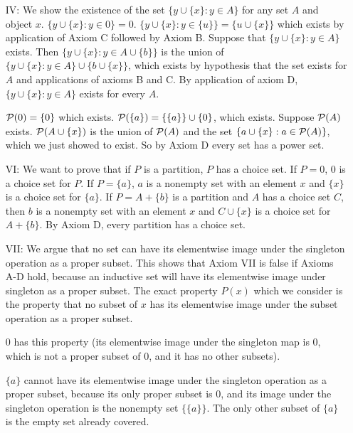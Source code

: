 \documentclass[12pt]{article}
\begin{document}
\begin{enumerate}
\begin{description}
\begin{enumerate}
\item[IV:]  We show the existence of the set $\{y \cup \{x\}:y \in A\}$ for any set $A$ and object $x$.  $\{y \cup \{x\}:y \in 0\} = 0$.
$\{y \cup \{x\}:y \in \{u\}\} = \{u \cup \{x\}\}$ which exists by application of Axiom C followed by Axiom B.  Suppose that $\{y \cup \{x\}:y \in A\}$ exists. Then $\{y \cup \{x\}:y \in A \cup \{b\}\}$ is the union of
$\{y \cup \{x\}:y \in A\} \cup \{b \cup \{x\}\}$, which exists by hypothesis that the set exists for $A$ and applications of axioms B and C.  By application of axiom D, $\{y \cup \{x\}:y \in A\}$ exists for every $A$.

${\cal P}(0) = \{0\}$ which exists.  ${\cal P}(\{a\}) = \{\{a\}\} \cup \{0\}$, which exists.  Suppose ${\cal P}(A)$ exists.  ${\cal P}(A \cup \{x\})$  is the union of ${\cal P}(A)$ and the set $\{a \cup \{x\}:a \in {\cal P}(A)\}$, which we just showed to exist.  So by Axiom D every set has a power set.

\item[VI:]  We want to prove that if $P$ is a partition, $P$ has a choice set.  If $P=0$, 0 is a choice set for $P$.  If $P= \{a\}$, $a$ is a nonempty set with an element $x$
and $\{x\}$ is a choice set for $\{a\}$.  If $P = A + \{b\}$ is a partition and $A$ has a choice set $C$, then $b$ is a nonempty set with an element $x$ and $C \cup \{x\}$ is a choice set for $A+\{b\}$.  By Axiom D, every partition has a choice set.

\item[VII:]  We argue that no set can have its elementwise image under the singleton operation as a proper subset.  This shows that Axiom VII is false if Axioms A-D hold, because
an inductive set will have its elementwise image under singleton as a proper subset.
The exact property $P(x)$ which we consider is the property that no subset of $x$ has its elementwise image under the subset operation as a proper subset.   

0 has this property (its elementwise image under the singleton map is 0, which is not a proper subset of 0, and it has no other subsets).

$\{a\}$ cannot have its elementwise image under the singleton operation as a proper subset, because its only proper subset is 0, and its image under the singleton operation is the nonempty set $\{\{a\}\}$.  The only other subset of $\{a\}$ is the empty set already covered.  


\end{enumerate}
\end{description}
\end{enumerate}
\end{document}
